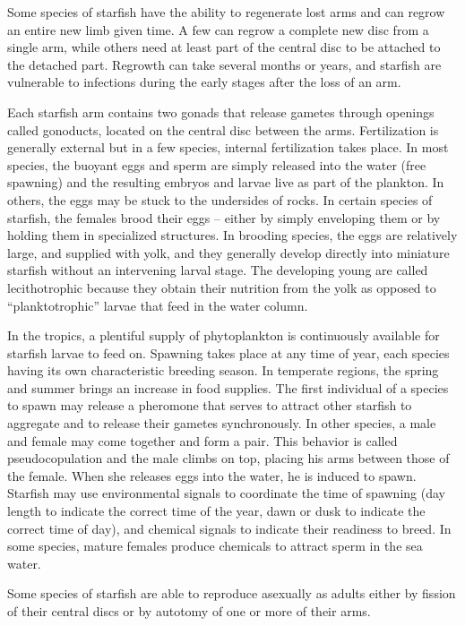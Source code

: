 \documentclass[]{book}
\begin{document}
Some species of starfish have the ability to regenerate lost arms and can regrow an entire new limb given time. A few can regrow a complete new disc from a single arm, while others need at least part of the central disc to be attached to the detached part. Regrowth can take several months or years, and starfish are vulnerable to infections during the early stages after the loss of an arm.

Each starfish arm contains two gonads that release gametes through openings called gonoducts, located on the central disc between the arms. Fertilization is generally external but in a few species, internal fertilization takes place. In most species, the buoyant eggs and sperm are simply released into the water (free spawning) and the resulting embryos and larvae live as part of the plankton. In others, the eggs may be stuck to the undersides of rocks. In certain species of starfish, the females brood their eggs -- either by simply enveloping them or by holding them in specialized structures. In brooding species, the eggs are relatively large, and supplied with yolk, and they generally develop directly into miniature starfish without an intervening larval stage. The developing young are called lecithotrophic because they obtain their nutrition from the yolk as opposed to ``planktotrophic'' larvae that feed in the water column.

In the tropics, a plentiful supply of phytoplankton is continuously available for starfish larvae to feed on. Spawning takes place at any time of year, each species having its own characteristic breeding season. In temperate regions, the spring and summer brings an increase in food supplies. The first individual of a species to spawn may release a pheromone that serves to attract other starfish to aggregate and to release their gametes synchronously. In other species, a male and female may come together and form a pair. This behavior is called pseudocopulation and the male climbs on top, placing his arms between those of the female. When she releases eggs into the water, he is induced to spawn. Starfish may use environmental signals to coordinate the time of spawning (day length to indicate the correct time of the year, dawn or dusk to indicate the correct time of day), and chemical signals to indicate their readiness to breed. In some species, mature females produce chemicals to attract sperm in the sea water.

Some species of starfish are able to reproduce asexually as adults either by fission of their central discs or by autotomy of one or more of their arms.
\end{document}
